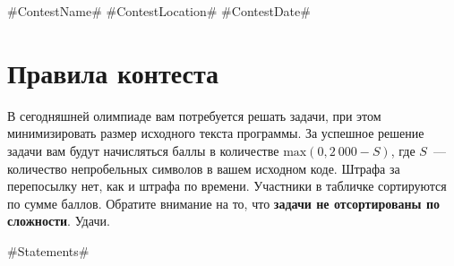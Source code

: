 \documentclass [11pt, a4paper, oneside] {article}
\begin{document}
\contest
{#ContestName#}%
{#ContestLocation#}%
{#ContestDate#}%


\renewcommand{\t}{\texttt}

\section*{Правила контеста}

В сегодняшней олимпиаде вам потребуется решать задачи, при этом минимизировать
размер исходного текста программы. За успешное решение задачи
вам будут начисляться баллы в количестве $\text{max}(0, 2\ 000 - S)$, где $S$~--- количество непробельных символов
в вашем исходном коде.
Штрафа за перепосылку нет, как и штрафа по времени.
Участники в табличке сортируются по сумме баллов.
Обратите внимание на то, что {\bf задачи не отсортированы по сложности}.
Удачи.

\newpage

#Statements#
\end{document}
